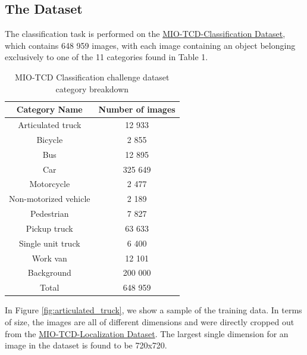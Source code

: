 \documentclass[12pt]{article}
\begin{document}
\subsection{The Dataset}

The classification task is performed on the \href{http://podoce.dinf.usherbrooke.ca/static/dataset/MIO-TCD-Classification.tar}{MIO-TCD-Classification Dataset}, which contains 648 959 images, with each image containing an object belonging exclusively to one of the 11 categories found in Table 1. 

    \begin{table}[H] 
    \centering
        \begin{tabular}{ || c | c ||}
            \hline
            \hline
            Category Name           & Number of images \\
            \hline
            Articulated truck       & 12 933    \\
            Bicycle                 & 2 855     \\
            Bus                     & 12 895    \\
            Car                     & 325 649   \\
            Motorcycle              & 2 477     \\
            Non-motorized vehicle   & 2 189     \\
            Pedestrian              & 7 827     \\
            Pickup truck            & 63 633    \\
            Single unit truck       & 6 400     \\
            Work van                & 12 101    \\
            Background              & 200 000   \\
            \hline
            Total                   & 648 959   \\
            \hline
            \hline
        \end{tabular}
    \caption{MIO-TCD Classification challenge dataset category breakdown}\label{tab:databreak}
    \end{table}

In Figure \ref{fig:articulated_truck}, we show a sample of the training data. In terms of size, the images are all of different dimensions and were directly cropped out from the \href{http://podoce.dinf.usherbrooke.ca/static/dataset/MIO-TCD-Classification.tar}{MIO-TCD-Localization Dataset}. The largest single dimension for an image in the dataset is found to be 720x720.
\end{document}
